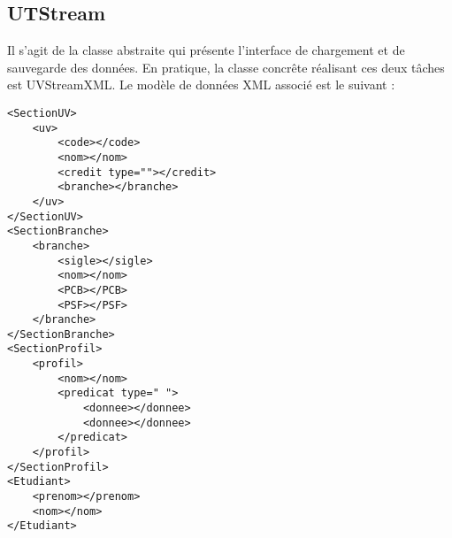 \documentclass[a4paper,10pt,french]{report}
\begin{document}
			\paragraph{}
		\subsubsection{}
			\paragraph{}
			\paragraph{}
			\paragraph{}
		\subsubsection{}
			\paragraph{}
			\paragraph{}
			\paragraph{}	
	\subsection{UTStream}\label{subsec:IB}
	
		Il s'agit de la classe abstraite qui présente l'interface de chargement et de sauvegarde des données.
		En pratique, la classe concrête réalisant ces deux tâches est UVStreamXML. Le modèle de données XML associé est le suivant :
		\begin{verbatim}
<SectionUV>
	<uv>
		<code></code>
		<nom></nom>
		<credit type=""></credit>
		<branche></branche>
	</uv>
</SectionUV>
<SectionBranche>
	<branche>
		<sigle></sigle>
		<nom></nom>
		<PCB></PCB>
		<PSF></PSF>
	</branche>
</SectionBranche>
<SectionProfil>
	<profil>
		<nom></nom>		
		<predicat type=" "> 
			<donnee></donnee>
			<donnee></donnee>
		</predicat>
	</profil>
</SectionProfil>
<Etudiant>
	<prenom></prenom>
	<nom></nom>
</Etudiant>
		\end{verbatim}
		
\end{document}

